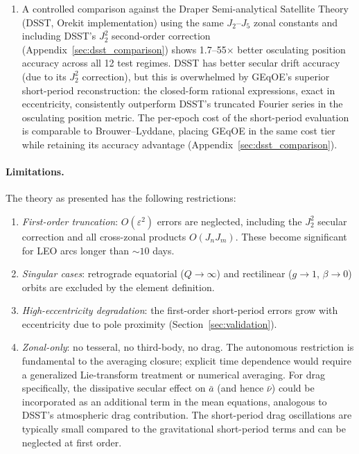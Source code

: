 \documentclass[11pt]{article}
\begin{document}
\begin{enumerate}
    \item A controlled comparison against the Draper Semi-analytical Satellite
    Theory (DSST, Orekit implementation) using the same $J_2$--$J_5$ zonal
    constants and including DSST's $J_2^2$ second-order correction
    (Appendix~\ref{sec:dsst_comparison}) shows 1.7--55$\times$ better
    osculating position accuracy across all 12 test regimes.
    DSST has better secular drift accuracy (due to its $J_2^2$ correction),
    but this is overwhelmed by GEqOE's superior short-period reconstruction:
    the closed-form rational expressions, exact in eccentricity, consistently
    outperform DSST's truncated Fourier series in the osculating position
    metric. The per-epoch cost of the short-period evaluation is comparable
    to Brouwer--Lyddane, placing GEqOE in the same cost tier while retaining
    its accuracy advantage (Appendix~\ref{sec:dsst_comparison}).
\end{enumerate}

\paragraph{Limitations.}
The theory as presented has the following restrictions:
\begin{enumerate}
\item \emph{First-order truncation}: $O(\varepsilon^2)$ errors are neglected,
  including the $J_2^2$ secular correction and all cross-zonal products
  $O(J_n J_m)$. These become significant for LEO arcs longer than
  $\sim\!10$ days.
\item \emph{Singular cases}: retrograde equatorial ($Q \to \infty$) and
  rectilinear ($g \to 1$, $\beta \to 0$) orbits are excluded by the
  element definition.
\item \emph{High-eccentricity degradation}: the first-order short-period
  errors grow with eccentricity due to pole proximity
  (Section~\ref{sec:validation}).
\item \emph{Zonal-only}: no tesseral, no third-body, no drag. The autonomous
  restriction is fundamental to the averaging closure; explicit time
  dependence would require a generalized Lie-transform treatment or
  numerical averaging. For drag specifically, the dissipative secular effect
  on $\bar a$ (and hence $\bar\nu$) could be incorporated as an additional
  term in the mean equations, analogous to DSST's atmospheric drag
  contribution. The short-period drag oscillations are typically small
  compared to the gravitational short-period terms and can be neglected at
  first order.
\end{enumerate}
\end{document}
